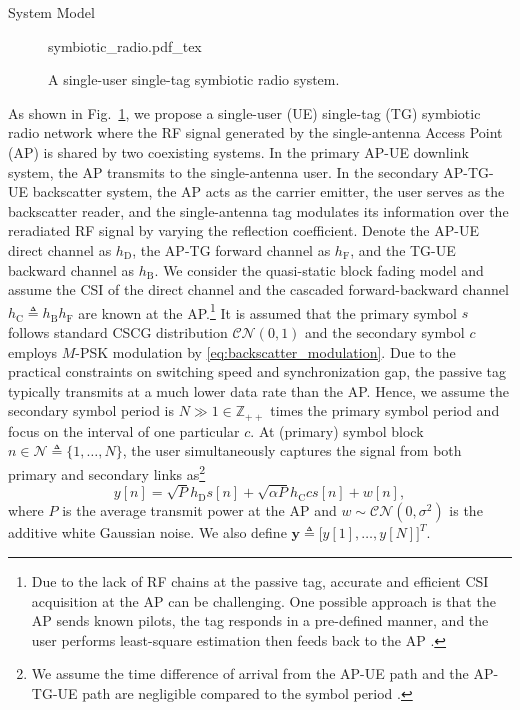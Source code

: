 \documentclass[journal]{IEEEtran}
\begin{document}
	\begin{section}{System Model}
		\begin{figure}[!t]
			\centering
			\def\svgwidth{0.9\columnwidth}
			{symbiotic_radio.pdf_tex}
			\caption{A single-user single-tag symbiotic radio system.}
			\label{fi:symbiotic_radio}
		\end{figure}
		As shown in Fig.~\ref{fi:symbiotic_radio}, we propose a single-user (UE) single-tag (TG) symbiotic radio network where the RF signal generated by the single-antenna Access Point (AP) is shared by two coexisting systems. In the primary AP-UE downlink system, the AP transmits to the single-antenna user. In the secondary AP-TG-UE backscatter system, the AP acts as the carrier emitter, the user serves as the backscatter reader, and the single-antenna tag modulates its information over the reradiated RF signal by varying the reflection coefficient. Denote the AP-UE direct channel as $h_{\mathrm{D}}$, the AP-TG forward channel as $h_{\mathrm{F}}$, and the TG-UE backward channel as $h_{\mathrm{B}}$. We consider the quasi-static block fading model and assume the CSI of the direct channel and the cascaded forward-backward channel $h_{\mathrm{C}} \triangleq h_{\mathrm{B}} h_{\mathrm{F}}$ are known at the AP.\footnote{Due to the lack of RF chains at the passive tag, accurate and efficient CSI acquisition at the AP can be challenging. One possible approach is that the AP sends known pilots, the tag responds in a pre-defined manner, and the user performs least-square estimation then feeds back to the AP \cite{Bharadia2015,Yang2015b,Guo2019e}.} It is assumed that the primary symbol $s$ follows standard CSCG distribution $\mathcal{CN}(0,1)$ and the secondary symbol $c$ employs $M$-PSK modulation by \eqref{eq:backscatter_modulation}. Due to the practical constraints on switching speed and synchronization gap, the passive tag typically transmits at a much lower data rate than the AP. Hence, we assume the secondary symbol period is $N \gg 1 \in \mathbb{Z}_{++}$ times the primary symbol period and focus on the interval of one particular $c$. At (primary) symbol block $n \in \mathcal{N} \triangleq \{1,\ldots,N\}$, the user simultaneously captures the signal from both primary and secondary links as\footnote{We assume the time difference of arrival from the AP-UE path and the AP-TG-UE path are negligible compared to the symbol period \cite{Guo2019b,Liang2020,Long2020a}.}
		\begin{equation}
			y[n] = \sqrt{P} h_{\mathrm{D}} s[n] + \sqrt{\alpha P} h_{\mathrm{C}} c s[n] + w[n],
		\end{equation}
		where $P$ is the average transmit power at the AP and $w \sim \mathcal{CN}(0,\sigma^2)$ is the additive white Gaussian noise. We also define $\boldsymbol{y} \triangleq \bigl[y[1], \ldots, y[N]\bigr]^T$.


\end{section}
\end{document}
